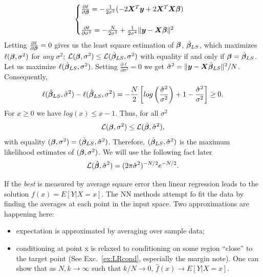 \begin{equation}
\begin{cases} 
\frac{\partial \ell}{\partial \bm \beta} = -\frac{1}{2\sigma^2} (-2\bm X^T \bm y + 2\bm X^T \bm X \bm \beta) \\ \\
\frac{\partial \ell}{\partial \sigma^2} = -\frac{N}{2\sigma^2} + 
\frac{1}{2\sigma^4} \lVert{\bm y - \bm X \bm \beta}\rVert^2
\end{cases}
\end{equation}
Letting $\frac{\partial \ell}{\partial \bm \beta} = 0$ gives us the
least square estimation of $\bm \beta$, $\hat {\bm \beta}_{LS}$,
which maximizes $\ell(\bm \beta, \sigma^2)$ for \emph{any} $\sigma^2$;
$\mathcal{L}(\bm \beta, \sigma^2) \le \mathcal{L}(\hat {\bm \beta}_{LS}, \sigma^2)$
with equality if and only if $\bm \beta = \hat {\bm \beta}_{LS}$.
Let us maximize $\ell(\hat {\bm \beta}_{LS}, \sigma^2)$.
Setting $\frac{\partial \ell}{\partial \sigma^2} = 0$ we get
$\hat \sigma^2 = \lVert{\bm y - \bm X \hat {\bm \beta}_{LS}}\rVert^2/N$.
Consequently,
\[\ell(\hat {\bm \beta}_{LS}, \hat \sigma^2) - \ell(\hat {\bm \beta}_{LS}, \sigma^2) = -\frac{N}{2}\left[log\left(\frac{\hat\sigma^2}{\sigma^2} \right) + 1 -\frac{\hat\sigma^2}{\sigma^2}\right] \ge 0. \]
For $x\ge 0$ we have $log(x) \le x-1$. Thus, for all $\sigma^2$
\[ \mathcal{L}(\bm \beta, \sigma^2) \le \mathcal{L}(\hat {\bm \beta}, \hat \sigma^2),\]
with equality \ifft $(\bm \beta, \sigma^2) = (\hat {\bm \beta}_{LS}, \hat \sigma^2)$.
Therefore, $(\hat {\bm \beta}_{LS}, \hat \sigma^2)$ is the maximum
likelihood estimates of $(\bm \beta, \sigma^2)$.
We will use the following fact later
\begin{equation}
\mathcal{L}(\hat {\bm \beta}, \hat \sigma^2) = (2 \pi \hat \sigma^2)^{-N/2} e^{-N/2}.
\end{equation}






\vspace{1.5in}

If the \textit{best} is measured by average square error
then linear regression leads to the solution $f(x) = E[Y |X = x]$.
The NN methods attempt fo fit the data by
finding the averages at each point in the input space.
Two approximations are happening here:
\begin{itemize}
\item expectation is approximated by averaging over sample data;
\item conditioning at point x is relaxed to conditioning on some region ``close'' to the target point (See Exc.~\ref{ex:LRcond}, especially the margin note). One can show that as $N,k \rightarrow \infty$
such that $k/N \rightarrow 0$, $\hat f(x) \rightarrow E[Y|X=x]$.
\end{itemize}

